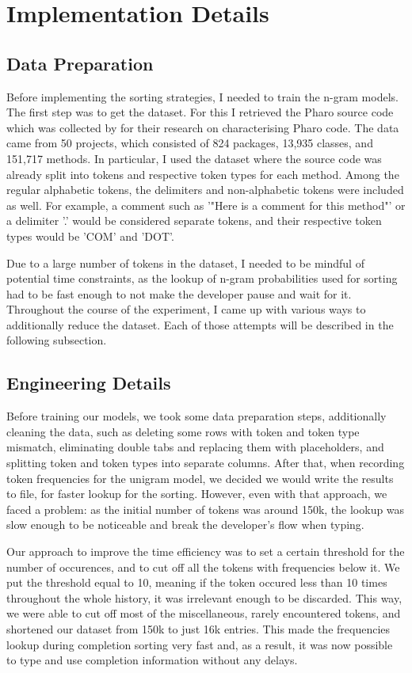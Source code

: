 \section{Implementation Details}
\label{sec:ProposedSolution-Implementation}
\subsection{Data Preparation}
Before implementing the sorting strategies, I needed to train the n-gram models. The first step was to get the dataset. For this I retrieved the Pharo source code which was collected by \cite{Zait20a} for their research on characterising Pharo code. The data came from 50 projects, which consisted of 824 packages, 13,935 classes, and 151,717 methods. In particular, I used the dataset where the source code was already split into tokens and respective token types for each method. Among the regular alphabetic tokens, the delimiters and non-alphabetic tokens were included as well. For example, a comment such as '"Here is a comment for this method"' or a delimiter '.' would be considered separate tokens, and their respective token types would be 'COM' and 'DOT'.

Due to a large number of tokens in the dataset, I needed to be mindful of potential time constraints, as the lookup of n-gram probabilities used for sorting had to be fast enough to not make the developer pause and wait for it. Throughout the course of the experiment, I came up with various ways to additionally reduce the dataset. Each of those attempts will be described in the following subsection.

\subsection{Engineering Details}
Before training our models, we took some data preparation steps, additionally cleaning the data, such as deleting some rows with token and token type mismatch, eliminating double tabs and replacing them with placeholders, and splitting token and token types into separate columns. After that, when recording token frequencies for the unigram model, we decided we would write the results to file, for faster lookup for the sorting. However, even with that approach, we faced a problem: as the initial number of tokens was around 150k, the lookup was slow enough to be noticeable and break the developer's flow when typing. 

Our approach to improve the time efficiency was to set a certain threshold for the number of occurences, and to cut off all the tokens with frequencies below it. We put the threshold equal to 10, meaning if the token occured less than 10 times throughout the whole history, it was irrelevant enough to be discarded. This way, we were able to cut off most of the miscellaneous, rarely encountered tokens, and shortened our dataset from 150k to just 16k entries. This made the frequencies lookup during completion sorting very fast and, as a result, it was now possible to type and use completion information without any delays.

